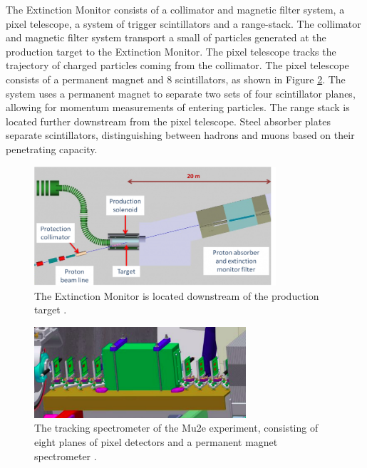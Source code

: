 The Extinction Monitor consists of a collimator and magnetic filter 
system, a pixel telescope, a system of trigger scintillators and a range-stack. The collimator and 
magnetic filter system transport a small  of 
 particles generated at the production target to the Extinction Monitor. The pixel telescope 
tracks the trajectory of charged particles coming from 
the collimator. The pixel telescope consists of a permanent magnet and 8 scintillators, as shown 
in Figure \ref{fig:extintionmonitor}. The system uses a 
permanent magnet to separate two sets of four scintillator planes, allowing for momentum measurements 
of entering particles. The range stack is located further 
downstream from the pixel telescope. Steel absorber plates separate scintillators, distinguishing 
between hadrons and muons based on their penetrating capacity.
\begin{figure}[!h]
\centering
\includegraphics[width =0.8\textwidth]{figures/png/800px-Extinction_filter.png}
\caption[The Extintion Monitor location.]{The Extinction Monitor is located downstream of the
production target \cite{Prebys:IPAC2015-THPF121}.}
\label{fig:extintion}
\end{figure}
\begin{figure}[!h]
\centering
\includegraphics[width =0.7\textwidth]{figures/png/Screenshot_20240306_184720.png}
\caption[The Extintion Monitor.]{The tracking spectrometer of the Mu2e experiment, consisting of eight planes of pixel detectors and a permanent magnet spectrometer \cite{Prebys:IPAC2015-THPF121}.}
\label{fig:extintionmonitor}
\end{figure}
